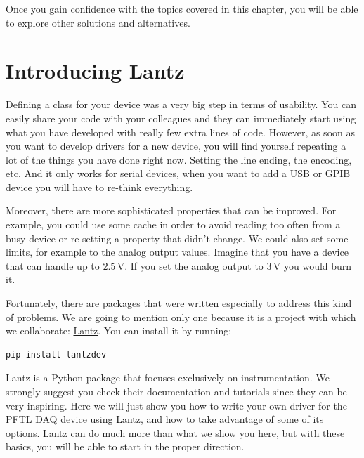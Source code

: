 Once you gain confidence with the topics covered in this chapter, you will be able to explore other solutions and alternatives.

\section{Introducing Lantz}\label{section:lantz}
Defining a class for your device was a very big step in terms of
usability. You can easily share your code with your colleagues and
they can immediately start using what you have developed with really few extra lines of code. However, as soon as you want to develop drivers for a new
device, you will find yourself repeating a lot of the things you have
done right now. Setting the line ending, the encoding, etc. And it only
works for serial devices, when you want to add a {USB} or {GPIB} device
you will have to re-think everything.

Moreover, there are more sophisticated properties that can be improved.
For example, you could use some cache in order to avoid reading too
often from a busy device or re-setting a property that didn't change. We
could also set some limits, for example to the analog output values. Imagine that you have a device that can handle up to $2.5\,\textrm{V}$. If you set the analog output to
$3\,\textrm{V}$ you would burn it. 

Fortunately, there are packages that were written especially to address this kind of problems. We are going to mention only one because it is
a project with which we collaborate: \href{https://github.com/lantzproject/lantz}{Lantz}. You can install it
by running:

\begin{verbatim}
pip install lantzdev
\end{verbatim}


Lantz is a Python package that focuses exclusively on instrumentation. We strongly suggest you check their documentation and tutorials since they
can be very inspiring. Here we will just show you how to write your own
driver for the {PFTL DAQ} device using Lantz, and how to take
advantage of some of its options. Lantz can do much more than what we show you here, but with these basics, you will be able to start in the
proper direction.

